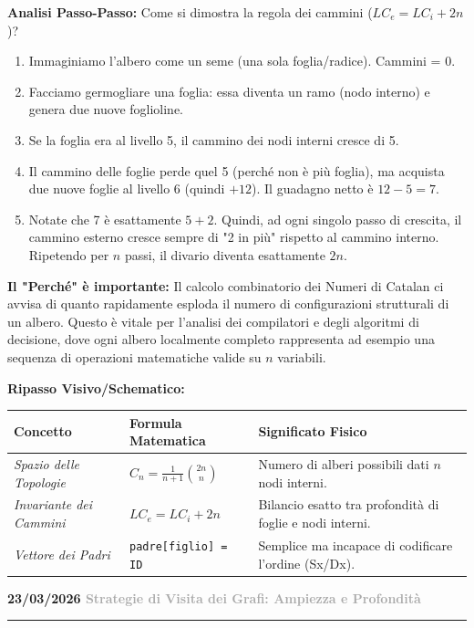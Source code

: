 \documentclass[a4paper, 11pt]{report}
\newcommand{\lezione}[2]{
\vspace{2em}
\noindent\textbf{\Large #1 \hfill \textcolor{darkgray}{#2}}
\vspace{0.5em}
\hrule
\vspace{1.5em}
}
\begin{document}
\textbf{Analisi Passo-Passo:}
Come si dimostra la regola dei cammini ($LC_e = LC_i + 2n$)?
\begin{enumerate}
    \item Immaginiamo l'albero come un seme (una sola foglia/radice). Cammini = 0.
    \item Facciamo germogliare una foglia: essa diventa un ramo (nodo interno) e genera due nuove foglioline.
    \item Se la foglia era al livello 5, il cammino dei nodi interni cresce di 5.
    \item Il cammino delle foglie perde quel 5 (perché non è più foglia), ma acquista due nuove foglie al livello 6 (quindi $+12$). Il guadagno netto è $12 - 5 = 7$.
    \item Notate che 7 è esattamente $5 + 2$. Quindi, ad ogni singolo passo di crescita, il cammino esterno cresce sempre di "2 in più" rispetto al cammino interno. Ripetendo per $n$ passi, il divario diventa esattamente $2n$.
\end{enumerate}

\textbf{Il "Perché" è importante:}
Il calcolo combinatorio dei Numeri di Catalan ci avvisa di quanto rapidamente esploda il numero di configurazioni strutturali di un albero. Questo è vitale per l'analisi dei compilatori e degli algoritmi di decisione, dove ogni albero localmente completo rappresenta ad esempio una sequenza di operazioni matematiche valide su $n$ variabili.

\textbf{Ripasso Visivo/Schematico:}
\begin{center}
\begin{tabular}{|p{4.5cm}|p{6cm}|p{4cm}|}
\hline
\textbf{Concetto} & \textbf{Formula Matematica} & \textbf{Significato Fisico} \\
\hline
\textit{Spazio delle Topologie} & $C_n = \frac{1}{n+1} \binom{2n}{n}$ & Numero di alberi possibili dati $n$ nodi interni. \\
\hline
\textit{Invariante dei Cammini} & $LC_e = LC_i + 2n$ & Bilancio esatto tra profondità di foglie e nodi interni. \\
\hline
\textit{Vettore dei Padri} & \texttt{padre[figlio] = ID} & Semplice ma incapace di codificare l'ordine (Sx/Dx). \\
\hline
\end{tabular}
\end{center}


\lezione{23/03/2026}{Strategie di Visita dei Grafi: Ampiezza e Profondità}
\end{document}
